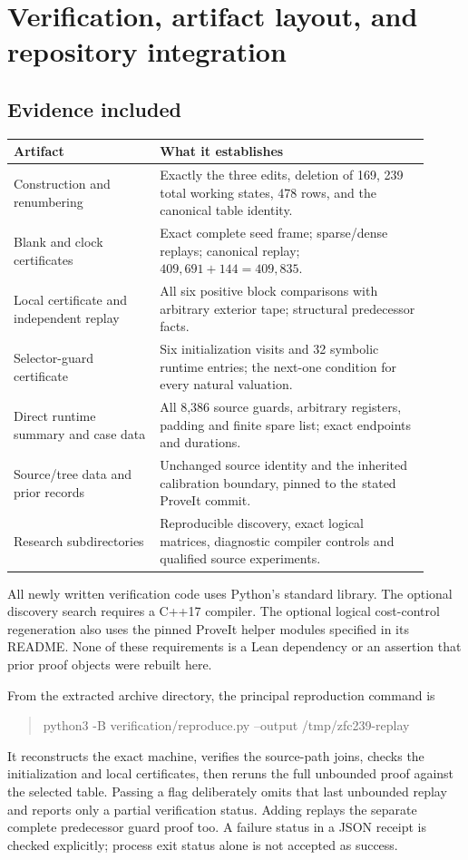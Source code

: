 \documentclass[11pt,a4paper]{article}
\newcommand{\file}[1]{\texttt{\detokenize{#1}}}
\begin{document}
\section{Verification, artifact layout, and repository integration}

\subsection{Evidence included}

\begin{center}
\small
\begin{tabular}{p{0.32\linewidth}p{0.59\linewidth}}
\toprule
Artifact & What it establishes\\
\midrule
Construction and renumbering & Exactly the three edits, deletion of 169,
  239 total working states, 478 rows, and the canonical table identity.\\
Blank and clock certificates & Exact complete seed frame; sparse/dense
  replays; canonical replay; $409,691+144=409,835$.\\
Local certificate and independent replay & All six positive block
  comparisons with arbitrary exterior tape; structural predecessor facts.\\
Selector-guard certificate & Six initialization visits and 32 symbolic
  runtime entries; the next-one condition for every natural valuation.\\
Direct runtime summary and case data & All 8,386 source guards, arbitrary
  registers, padding and finite spare list; exact endpoints and durations.\\
Source/tree data and prior records & Unchanged source identity and the
  inherited calibration boundary, pinned to the stated ProveIt commit.\\
Research subdirectories & Reproducible discovery, exact logical matrices,
  diagnostic compiler controls and qualified source experiments.\\
\bottomrule
\end{tabular}
\end{center}

All newly written verification code uses Python's standard library.
The optional discovery search requires a C++17 compiler. The optional
logical cost-control regeneration also uses the pinned ProveIt helper
modules specified in its README. None of these requirements is a Lean
dependency or an assertion that prior proof objects were rebuilt here.

From the extracted archive directory, the principal reproduction command
is
\begin{quote}\small\ttfamily
python3 -B verification/reproduce.py --output /tmp/zfc239-replay
\end{quote}
It reconstructs the exact machine, verifies the source-path joins,
checks the initialization and local certificates, then reruns the full
unbounded proof against the selected table. Passing a \file{--quick}
flag deliberately omits that last unbounded replay and reports only a
partial verification status. Adding \file{--with-guard} replays the
separate complete predecessor guard proof too. A failure status in a
JSON receipt is checked explicitly; process exit status alone is not
accepted as success.
\end{document}
